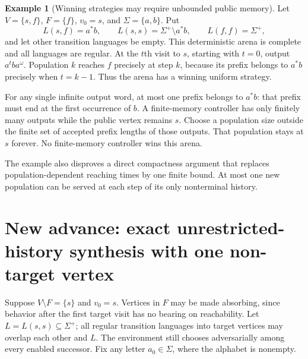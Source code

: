 \documentclass[11pt]{article}
\theoremstyle{definition}
\newtheorem{example}{Example}
\theoremstyle{remark}
\begin{document}
\begin{example}[Winning strategies may require unbounded public memory]
Let $V=\{s,f\}$, $F=\{f\}$, $v_0=s$, and $\Sigma=\{a,b\}$. Put
\[
 L(s,f)=a^*b,\qquad L(s,s)=\Sigma^+\setminus a^*b,
 \qquad L(f,f)=\Sigma^+,
\]
and let other transition languages be empty. This deterministic arena is complete and all languages are regular. At the $t$th visit to $s$, starting with $t=0$, output $a^tba^\omega$. Population $k$ reaches $f$ precisely at step $k$, because its prefix belongs to $a^*b$ precisely when $t=k-1$. Thus the arena has a winning uniform strategy.

For any single infinite output word, at most one prefix belongs to $a^*b$: that prefix must end at the first occurrence of $b$. A finite-memory controller has only finitely many outputs while the public vertex remains $s$. Choose a population size outside the finite set of accepted prefix lengths of those outputs. That population stays at $s$ forever. No finite-memory controller wins this arena.
\end{example}

The example also disproves a direct compactness argument that replaces population-dependent reaching times by one finite bound. At most one new population can be served at each step of its only nonterminal history.


\section{New advance: exact unrestricted-history synthesis with one non-target vertex}
Suppose $V\setminus F=\{s\}$ and $v_0=s$. Vertices in $F$ may be made
absorbing, since behavior after the first target visit has no bearing on
reachability. Let $L=L(s,s)\subseteq\Sigma^+$; all regular transition
languages into target vertices may overlap each other and $L$.
The environment still chooses adversarially among every enabled successor.
Fix any letter $a_0\in\Sigma$, where the alphabet is nonempty.
\end{document}
